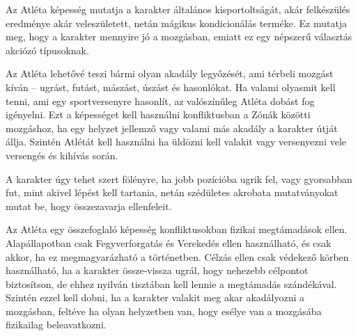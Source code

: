 
Az Atléta képesség mutatja a karakter általános kisportoltságát, akár felkészülés eredménye akár veleszületett, netán mágikus kondicionálás terméke. Ez mutatja meg, hogy a karakter mennyire jó a mozgásban, emiatt ez egy népszerű választás akciózó típusoknak.

\overcome Az Atléta lehetővé teszi bármi olyan akadály legyőzését, ami térbeli mozgást kíván -- ugrást, futást, mászást, úszást és hasonlókat. Ha valami olyasmit kell tenni, ami egy sportversenyre hasonlít, az valószínűleg Atléta dobást fog igényelni. Ezt a képességet kell használni konfliktusban a Zónák közötti mozgáshoz, ha egy helyzet jellemző vagy valami más akadály a karakter útját állja. Szintén Atlétát kell használni ha üldözni kell valakit vagy versenyezni vele versengés és kihívás során.

\advantage A karakter úgy tehet szert fölényre, ha jobb pozícióba ugrik fel, vagy gyorsabban fut, mint akivel lépést kell tartania, netán szédületes akrobata mutatványokat mutat be, hogy összezavarja ellenfeleit.

\noattackatall

 Az Atléta egy összefoglaló képesség konfliktusokban fizikai megtámadások ellen. Alapállapotban csak Fegyverforgatás és Verekedés ellen használható, és csak akkor, ha ez megmagyarázható a történetben. Célzás ellen csak védekező körben használható, ha a karakter össze-vissza ugrál, hogy nehezebb célpontot biztosítson, de ehhez nyilván tisztában kell lennie a megtámadás szándékával. Szintén ezzel kell dobni, ha a karakter valakit meg akar akadályozni a mozgásban, feltéve ha olyan helyzetben van, hogy esélye van a mozgásába fizikailag beleavatkozni.

